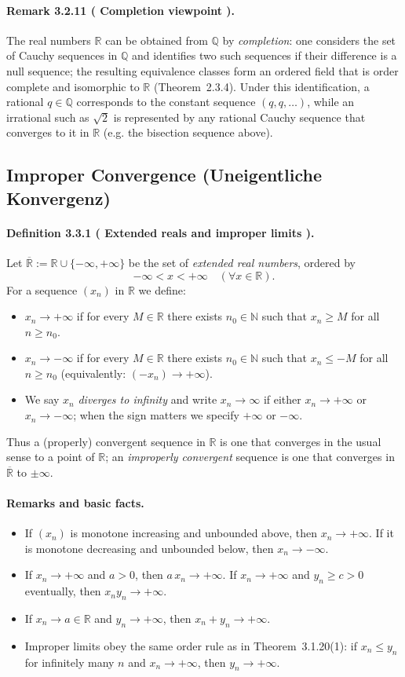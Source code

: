 \documentclass[12pt,a4paper]{article}
\newcommand{\N}{\mathbb{N}}
\newcommand{\Q}{\mathbb{Q}}
\newcommand{\R}{\mathbb{R}}
\newcommand{\NumberedDefinition}[3]{%
\paragraph*{Definition #1 ( #2 ).} #3\par}
\newcommand{\NumberedRemark}[3]{%
\paragraph*{Remark #1 ( #2 ).} #3\par}
\theoremstyle{plain}
\theoremstyle{definition}
\theoremstyle{remark}
\begin{document}
\NumberedRemark{3.2.11}{Completion viewpoint}{The real numbers $\R$ can be obtained from $\Q$ by \emph{completion}: one considers the set of Cauchy sequences in $\Q$ and identifies two such sequences if their difference is a null sequence; the resulting equivalence classes form an ordered field that is order complete and isomorphic to $\R$ (Theorem~2.3.4). Under this identification, a rational $q\in\Q$ corresponds to the constant sequence $(q,q,\dots)$, while an irrational such as $\sqrt{2}$ is represented by any rational Cauchy sequence that converges to it in $\R$ (e.g. the bisection sequence above).}

\subsection{Improper Convergence (Uneigentliche Konvergenz)}
\NumberedDefinition{3.3.1}{Extended reals and improper limits}{Let $\overline{\R}:=\R\cup\{-\infty,+\infty\}$ be the set of \emph{extended real numbers}, ordered by
\[
	-\infty < x < +\infty \quad (\forall x\in\R).
\]
For a sequence $(x_n)$ in $\R$ we define:
\begin{itemize}[leftmargin=*]
	\item $x_n \to +\infty$ if for every $M\in\R$ there exists $n_0\in\N$ such that $x_n\ge M$ for all $n\ge n_0$.
	\item $x_n \to -\infty$ if for every $M\in\R$ there exists $n_0\in\N$ such that $x_n\le -M$ for all $n\ge n_0$ (equivalently: $(-x_n)\to +\infty$).
	\item We say $x_n$ \emph{diverges to infinity} and write $x_n\to \infty$ if either $x_n\to +\infty$ or $x_n\to -\infty$; when the sign matters we specify $+\infty$ or $-\infty$.
\end{itemize}
Thus a (properly) convergent sequence in $\R$ is one that converges in the usual sense to a point of $\R$; an \emph{improperly convergent} sequence is one that converges in $\overline{\R}$ to $\pm\infty$.
}

\paragraph{Remarks and basic facts.}
\begin{itemize}[leftmargin=*]
	\item If $(x_n)$ is monotone increasing and unbounded above, then $x_n\to +\infty$. If it is monotone decreasing and unbounded below, then $x_n\to -\infty$.
	\item If $x_n\to +\infty$ and $a>0$, then $a\,x_n\to +\infty$. If $x_n\to +\infty$ and $y_n\ge c>0$ eventually, then $x_n y_n\to +\infty$.
	\item If $x_n\to a\in\R$ and $y_n\to +\infty$, then $x_n+y_n\to +\infty$.
	\item Improper limits obey the same order rule as in Theorem~3.1.20(1): if $x_n\le y_n$ for infinitely many $n$ and $x_n\to +\infty$, then $y_n\to +\infty$.
\end{itemize}
\end{document}
